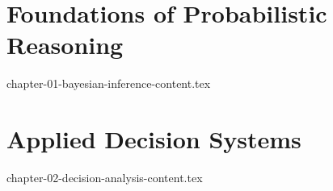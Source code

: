 \documentclass[10pt,letterpaper,twoside,openright,twocolumn]{book}
\begin{document}
\frontmatter
\onecolumn
\BayesBookCover
\BayesCopyrightPage
\BayesOpeningPage
\cleardoublepage

\tableofcontents
\cleardoublepage
\twocolumn

\mainmatter
\part{Foundations of Probabilistic Reasoning}
{chapter-01-bayesian-inference-content.tex}

\part{Applied Decision Systems}
{chapter-02-decision-analysis-content.tex}

\backmatter
\onecolumn
\BayesBackCover
\end{document}

